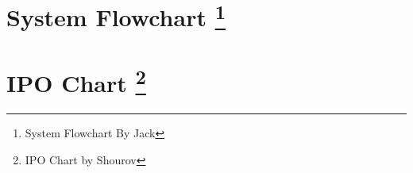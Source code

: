 \documentclass[oneside,openany,11pt,a4paper]{report}
\begin{document}
\section[System Flowchart]{System Flowchart \protect\footnote{System Flowchart By Jack}}

\section[IPO Chart]{IPO Chart \protect\footnote{IPO Chart by Shourov}}
\centering
\end{document}
